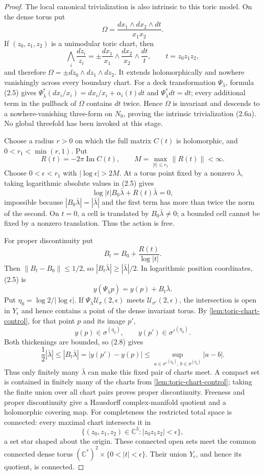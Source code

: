 \begin{proof}
The local canonical trivialization is also intrinsic to this toric model.
On the dense torus put
\[
 \Omega=\frac{dx_1\wedge dx_2\wedge dt}{x_1x_2}.
\]
If \((z_0,z_1,z_2)\) is a unimodular toric chart, then
\[
 \bigwedge_i\frac{dz_i}{z_i}
 =\pm\frac{dx_1}{x_1}\wedge\frac{dx_2}{x_2}\wedge\frac{dt}{t},
 \qquad t=z_0z_1z_2,
\]
and therefore \(\Omega=\pm dz_0\wedge dz_1\wedge dz_2\).  It extends
holomorphically and nowhere vanishingly across every boundary chart.
For a deck transformation \(\Psi_{\bar\lambda}\), formula (2.5) gives
\(\Psi_{\bar\lambda}^*(dx_i/x_i)=dx_i/x_i+\alpha_i(t)dt\) and
\(\Psi_{\bar\lambda}^*dt=dt\); every additional term in the pullback of
\(\Omega\) contains \(dt\) twice.  Hence \(\Omega\) is invariant and descends
to a nowhere-vanishing three-form on \(N_0\), proving the intrinsic
trivialization (2.6a).  No global threefold has been invoked at this stage.

Choose a radius \(r>0\) on which the full matrix \(C(t)\) is holomorphic,
and \(0<r_1<\min(r,1)\).  Put
\[
 R(t)=-2\pi\operatorname{Im}C(t),\qquad
 M=\max_{|t|\le r_1}\|R(t)\|<\infty.
\]
Choose \(0<\epsilon<r_1\) with \(|\log\epsilon|>2M\).
At a torus point fixed by a nonzero
\(\bar\lambda\), taking logarithmic absolute values in (2.5) gives
\[
 \log|t|B_0\bar\lambda+R(t)\bar\lambda=0,
\]
impossible because \(|B_0\bar\lambda|=|\bar\lambda|\) and the first term
has more than twice the norm of the second.  On \(t=0\), a cell is translated
by \(B_0\bar\lambda\ne0\); a bounded cell cannot be fixed by a nonzero
translation.  Thus the action is free.

For proper discontinuity put
\[
 B_t=B_0+\frac{R(t)}{\log|t|}.
\]
Then \(\|B_t-B_0\|\le1/2\), so
\(|B_t\bar\lambda|\ge|\bar\lambda|/2\).  In logarithmic position
coordinates, (2.5) is
\[
 y(\Psi_{\bar\lambda}p)=y(p)+B_t\bar\lambda.
\tag{2.8}
\]
Put \(\eta_0=\log2/|\log\epsilon|\).  If
\(\Psi_{\bar\lambda}\mathcal U_\sigma(2,\epsilon)\) meets
\(\mathcal U_{\sigma'}(2,\epsilon)\), the intersection is open in
\(Y_\epsilon\) and hence contains a
point of the dense invariant torus.  By \cref{lem:toric-chart-control}, for
that point \(p\) and its image \(p'\),
\[
 y(p)\in\sigma^{(\eta_0)},\qquad
 y(p')\in{\sigma'}^{(\eta_0)}.
\]
Both thickenings are bounded, so (2.8) gives
\[
 \frac12|\bar\lambda|
 \le |B_t\bar\lambda|
 =|y(p')-y(p)|
 \le \sup_{a\in{\sigma'}^{(\eta_0)},\,b\in\sigma^{(\eta_0)}}|a-b|.
\]
Thus only finitely many \(\bar\lambda\) can make this fixed pair of charts
meet.  A compact set is contained in finitely many of the charts from
\cref{lem:toric-chart-control}; taking the finite union over all chart pairs
proves proper discontinuity.  Freeness and proper discontinuity give a
Hausdorff complex-manifold quotient and a holomorphic covering map.
For completeness the restricted total space is connected: every maximal
chart intersects it in
\[
 \{(z_0,z_1,z_2)\in\mathbb C^3:|z_0z_1z_2|<\epsilon\},
\]
a set star shaped about the origin.  These connected open sets meet the
common connected dense torus
\((\mathbb C^*)^2\times\{0<|t|<\epsilon\}\).  Their union
\(Y_\epsilon\), and hence its quotient, is connected.


\end{proof}
